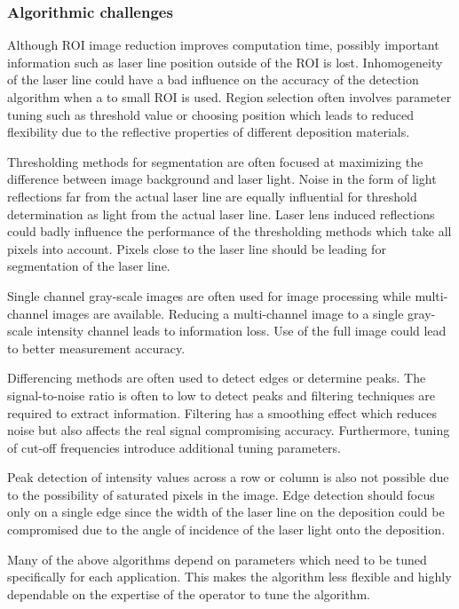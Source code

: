 \documentclass[10pt,letter]{article}
\begin{document}
\subsubsection{Algorithmic challenges}
Although ROI image reduction improves computation time, possibly important information such as laser line position outside of the ROI is lost. Inhomogeneity of the laser line could have a bad influence on the accuracy of the detection algorithm when a to small ROI is used. Region selection often involves parameter tuning such as threshold value or choosing position which leads to reduced flexibility due to the reflective properties of different deposition materials. 

Thresholding methods for segmentation are often focused at maximizing the difference between image background and laser light. Noise in the form of light reflections far from the actual laser line are equally influential for threshold determination as light from the actual laser line. Laser lens induced reflections could badly influence the performance of the thresholding methods which take all pixels into account. Pixels close to the laser line should be leading for segmentation of the laser line. 

Single channel gray-scale images are often used for image processing while multi-channel images are available. Reducing a multi-channel image to a single gray-scale intensity channel leads to information loss. Use of the full image could lead to better measurement accuracy.

Differencing methods are often used to detect edges or determine peaks. The signal-to-noise ratio is often to low to detect peaks and filtering techniques are required to extract information. Filtering has a smoothing effect which reduces noise but also affects the real signal compromising accuracy. Furthermore, tuning of cut-off frequencies introduce additional tuning parameters. 

Peak detection of intensity values across a row or column is also not possible due to the possibility of saturated pixels in the image. Edge detection should focus only on a single edge since the width of the laser line on the deposition could be compromised due to the angle of incidence of the laser light onto the deposition.

Many of the above algorithms depend on parameters which need to be tuned specifically for each application. This makes the algorithm less flexible and highly dependable on the expertise of the operator to tune the algorithm. 
\end{document}
